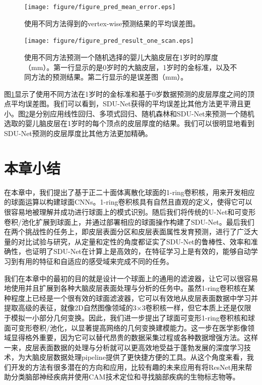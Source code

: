 \begin{figure}[t]
	\centering
	\texttt{[image: figure/figure\_pred\_mean\_error.eps]}
	\caption{使用不同方法得到的vertex-wise预测结果的平均误差图。}
	\label{fig:thickness_prediction_mean_error}
\end{figure}

\begin{figure}[t]
	\centering
	\texttt{[image: figure/figure\_pred\_result\_one\_scan.eps]}
	\caption{使用不同方法预测一个随机选择的婴儿大脑皮层在1岁时的厚度（mm）。第一行显示的是0岁时的大脑皮层，1岁时的金标准，以及不同方法的预测结果。第二行显示的是误差图（mm）。}
	\label{fig:thickness_prediction_result_one_scan}
\end{figure}

图\ref{fig:thickness_prediction_mean_error}显示了使用不同方法在1岁时的金标准和基于0岁数据预测的皮层厚度之间的顶点平均误差图。我们可以看到，SDU-Net获得的平均误差比其他方法更平滑且更小。图\ref{fig:thickness_prediction_result_one_scan}是分别应用线性回归、多项式回归、随机森林和SDU-Net来预测一个随机选取的婴儿脑皮层在1岁时的每个顶点的皮层厚度的结果。我们可以很明显地看到SDU-Net预测的皮层厚度比其他方法更加精确。


\section{本章小结}
在本章中，我们提出了基于正二十面体离散化球面的1-ring卷积核，用来开发相应的球面运算以构建球面CNNs。1-ring卷积核具有自然且直观的定义，使得它可以很容易地被理解并成功进行球面上的模式识别。随后我们将传统的U-Net和可变形卷积/池化扩展到球面上，并通过部署相应的球面操作构建了SDU-Net。最后我们在两个挑战性的任务上，即皮层表面分区和皮层表面属性发育预测，进行了广泛大量的对比试验与研究，从定量和定性的角度都证实了SDU-Net的鲁棒性、效率和准确性，也证明了SDU-Net在计算上是高效的，在特征学习上是有效的，能够自动学习到有用的特征和自适应的感受域来完成不同的任务。

我们在本章中的最初的目的就是设计一个球面上的通用的滤波器，让它可以很容易地使用并且扩展到各种大脑皮层表面处理与分析的任务中。虽然1-ring卷积核在某种程度上已经是一个很有效的球面滤波器，它可以有效地从皮层表面数据中学习并提取高级的表征，就像2D自然图像领域的3$\times$3卷积核一样，但它本质上还是仅限于模拟一小部分几何变换。因此，我们进一步提出了球面可变形1-ring卷积核和球面可变形卷积/池化，以显著提高网络的几何变换建模能力。这一步在医学影像领域显得格外重要，因为它可以替代昂贵的数据采集过程或各种数据增强方法。这样一来，皮层表面数据的处理与分析就可以更高效地受益于蓬勃发展的深度学习技术，为大脑皮层数据处理pipeline提供了更快捷方便的工具。从这个角度来看，我们开发的方法有很多潜在的方向和应用，比较有趣的未来应用有将ResNet\cite{he2016deep}用来帮助分类脑部神经疾病并使用CAM技术\cite{zhou2015cnnlocalization}定位和寻找脑部疾病的生物标志物等。

